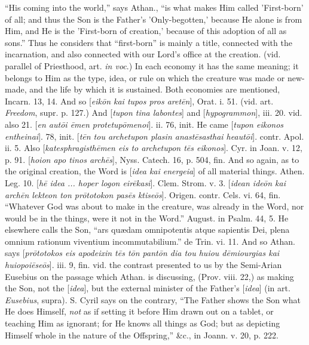 ``His coming into the world,'' says Athan., ``is
what makes Him called 'First-born' of all; and thus the Son is the
Father's 'Only-begotten,' because He alone is from Him, and He is the
'First-born of creation,' because of this adoption of all as sons.''
Thus he considers that ``first-born'' is mainly a title, connected with
the incarnation, and also connected with our Lord's office at the
creation. (vid. parallel of Priesthood, art. \emph{in voc}.) In each
economy it has the same meaning; it belongs to Him as the type, idea,
or rule on which the creature was made or new-made, and the life by
which it is sustained. Both economies are mentioned, Incarn. 13, 14.
And so [\emph{eik\={o}n kai tupos pros aret\={e}n}], Orat. i.
51. (vid. art. \emph{Freedom}, supr. p. 127.) And [\emph{tupon tina
labontes}] and [\emph{hypogrammon}], iii. 20. vid. also 21. [\emph{en
aut\={o}i \={e}men protetup\={o}menoi}]. ii. 76, init.
He came [\emph{tupon eikonos entheinai}]. 78, init. [\emph{t\={e}n
tou archetupon plasin anast\={e}sasthai heaut\={o}i}]. contr.
Apol. ii. 5. Also [\emph{katesphragisth\={e}men eis to archetupon t\={e}s
eikonos}]. Cyr. in Joan. v. 12, p. 91. [\emph{hoion apo tinos arch\={e}s}],
Nyss. Catech. 16, p. 504, fin. And so again, as to the original
creation, the Word is [\emph{idea kai energeia}] of all material
things. Athen. Leg. 10. [\emph{h\={e} idea ... hoper logon eir\={e}kasi}].
Clem. Strom. v. 3. [\emph{idean ide\={o}n kai arch\={e}n lekteon
ton pr\={o}totokon pas\={e}s ktise\={o}s}]. Origen. contr.
Cels. vi. 64, fin. ``Whatever God was about to make in the creature,
was already in the Word, nor would be in the things, were it not in
the Word.'' August. in Psalm. 44, 5. He elsewhere calls the Son, ``ars
quædam omnipotentis atque sapientis Dei, plena omnium rationum
viventium incommutabilium.'' de Trin. vi. 11. And so Athan. says [\emph{pr\={o}totokos
eis apodeixin t\={e}s t\={o}n pant\={o}n dia tou huiou d\={e}miourgias
kai huiopoi\={e}se\={o}s}]. iii. 9, fin. vid. the contrast
presented to us by the Semi-Arian Eusebius on the passage which Athan.
is discussing, (Prov. viii. 22,) as making the Son, not the [\emph{idea}],
but the external minister of the Father's [\emph{idea}] (in art. \emph{Eusebius},
supra). S. Cyril says on the contrary, ``The Father shows the Son what
He does Himself, \emph{not} as if setting it before Him drawn out on a
tablet, or teaching Him as ignorant; for He knows all things as God;
but as depicting Himself whole in the nature of the Offspring,''
\&c., in Joann. v. 20, p. 222.

\xsection{[Rheustos]}

